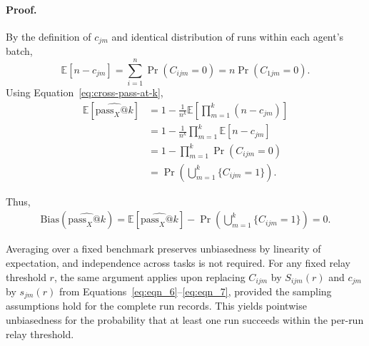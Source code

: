 \paragraph{Proof.} By the definition of $c_{jm}$ and identical distribution of runs within each agent's batch,
\begin{equation}
    \mathbb{E}[n-c_{jm}] = \sum_{i=1}^{n}\Pr(C_{ijm}=0)=n\Pr(C_{1jm} =0).
\end{equation}
Using Equation~\ref{eq:cross-pass-at-k},
\begin{equation}
    \begin{split}
        \mathbb{E}[\widehat{\text{pass}_{X}\text{@}k}] &= 1 - \frac{1}{n^k}\mathbb{E}\left[\prod_{m=1}^k ({n-c_{jm}})\right] \\
        &= 1 - \frac{1}{n^k}\prod_{m=1}^k\mathbb{E}[n-c_{jm}] \\
        &= 1 - \prod_{m=1}^k\Pr(C_{ijm}=0) \\
        &= \Pr \left( \bigcup_{m=1}^k \{C_{ijm}=1\} \right).
    \end{split}
\end{equation}

Thus, 
\begin{align}
        \text{Bias}(\widehat{\text{pass}_{X}\text{@}k}) = \mathbb{E}[\widehat{\text{pass}_{X}\text{@}k}] - \Pr \left( \bigcup_{m=1}^k \{C_{ijm}=1\} \right) = 0.
\end{align}

Averaging over a fixed benchmark preserves unbiasedness by linearity of expectation, and independence across tasks is not required. For any fixed relay threshold $r$, the same argument applies upon replacing $C_{ijm}$ by $S_{ijm}(r)$ and $c_{jm}$ by $s_{jm}(r)$ from Equations~\eqref{eq:eqn_6}--\eqref{eq:eqn_7}, provided the sampling assumptions hold for the complete run records. This yields pointwise unbiasedness for the probability that at least one run succeeds within the per-run relay threshold. 
